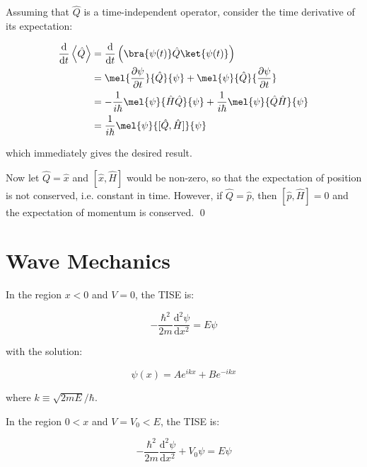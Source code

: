\documentclass[12pt]{article}
\begin{document}
Assuming that $\hat{Q}$ is a time-independent operator, consider the time derivative of its expectation:

\begin{equation}
    \begin{split}
        \frac{\mathrm{d}}{\mathrm{d}t} \left\langle \hat{Q} \right\rangle &= \frac{\mathrm{d}}{\mathrm{d}t} \left( \bra{\psi(t)} \hat{Q} \ket{\psi(t)} \right) \\
        &= \mel{\frac{\partial \psi}{\partial t}}{\hat{Q}}{\psi} + \mel{\psi}{\hat{Q}}{\frac{\partial \psi}{\partial t}} \\
        &= -\frac{1}{i\hbar} \mel{\psi}{\hat{H} \hat{Q}}{\psi} + \frac{1}{i\hbar} \mel{\psi}{\hat{Q} \hat{H}}{\psi} \\
        &= \frac{1}{i\hbar} \mel{\psi}{[\hat{Q}, \hat{H}]}{\psi}
    \end{split}
\end{equation}

which immediately gives the desired result.

Now let $\hat{Q} = \hat{x}$ and $[\hat{x}, \hat{H}]$ would be non-zero, so that the expectation of position is not conserved, i.e. constant in time. However, if $\hat{Q} = \hat{p}$, then $[\hat{p}, \hat{H}] = 0$ and the expectation of momentum is conserved.
\qed


\pagebreak
\section*{Wave Mechanics}


In the region $x < 0$ and $V = 0$, the TISE is:

\begin{equation}
    -\frac{\hbar^{2}}{2m} \frac{\mathrm{d}^{2} \psi}{\mathrm{d}x^{2}} = E \psi
\end{equation}

with the solution:

\begin{equation}
    \psi(x) = Ae^{ikx} + Be^{-ikx}
\end{equation}

where $k \equiv \sqrt{2mE}/\hbar$.

In the region $0 < x$ and $V = V_{0} < E$, the TISE is:

\begin{equation}
    -\frac{\hbar^{2}}{2m} \frac{\mathrm{d}^{2} \psi}{\mathrm{d}x^{2}} + V_{0} \psi = E \psi
\end{equation}
\end{document}
